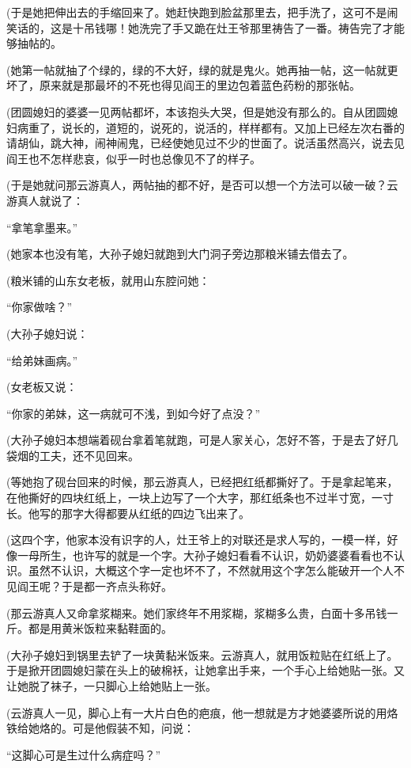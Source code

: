 \par (于是她把伸出去的手缩回来了。她赶快跑到脸盆那里去，把手洗了，这可不是闹笑话的，这是十吊钱哪！她洗完了手又跪在灶王爷那里祷告了一番。祷告完了才能够抽帖的。
\par (她第一帖就抽了个绿的，绿的不大好，绿的就是鬼火。她再抽一帖，这一帖就更坏了，原来就是那最坏的不死也得见阎王的里边包着蓝色药粉的那张帖。
\par (团圆媳妇的婆婆一见两帖都坏，本该抱头大哭，但是她没有那么的。自从团圆媳妇病重了，说长的，道短的，说死的，说活的，样样都有。又加上已经左次右番的请胡仙，跳大神，闹神闹鬼，已经使她见过不少的世面了。说活虽然高兴，说去见阎王也不怎样悲哀，似乎一时也总像见不了的样子。
\par (于是她就问那云游真人，两帖抽的都不好，是否可以想一个方法可以破一破？云游真人就说了：
\par “拿笔拿墨来。”
\par (她家本也没有笔，大孙子媳妇就跑到大门洞子旁边那粮米铺去借去了。
\par (粮米铺的山东女老板，就用山东腔问她：
\par “你家做啥？”
\par (大孙子媳妇说：
\par “给弟妹画病。”
\par (女老板又说：
\par “你家的弟妹，这一病就可不浅，到如今好了点没？”
\par (大孙子媳妇本想端着砚台拿着笔就跑，可是人家关心，怎好不答，于是去了好几袋烟的工夫，还不见回来。
\par (等她抱了砚台回来的时候，那云游真人，已经把红纸都撕好了。于是拿起笔来，在他撕好的四块红纸上，一块上边写了一个大字，那红纸条也不过半寸宽，一寸长。他写的那字大得都要从红纸的四边飞出来了。
\par (这四个字，他家本没有识字的人，灶王爷上的对联还是求人写的，一模一样，好像一母所生，也许写的就是一个字。大孙子媳妇看看不认识，奶奶婆婆看看也不认识。虽然不认识，大概这个字一定也坏不了，不然就用这个字怎么能破开一个人不见阎王呢？于是都一齐点头称好。
\par (那云游真人又命拿浆糊来。她们家终年不用浆糊，浆糊多么贵，白面十多吊钱一斤。都是用黄米饭粒来黏鞋面的。
\par (大孙子媳妇到锅里去铲了一块黄黏米饭来。云游真人，就用饭粒贴在红纸上了。于是掀开团圆媳妇蒙在头上的破棉袄，让她拿出手来，一个手心上给她贴一张。又让她脱了袜子，一只脚心上给她贴上一张。
\par (云游真人一见，脚心上有一大片白色的疤痕，他一想就是方才她婆婆所说的用烙铁给她烙的。可是他假装不知，问说：
\par “这脚心可是生过什么病症吗？”
